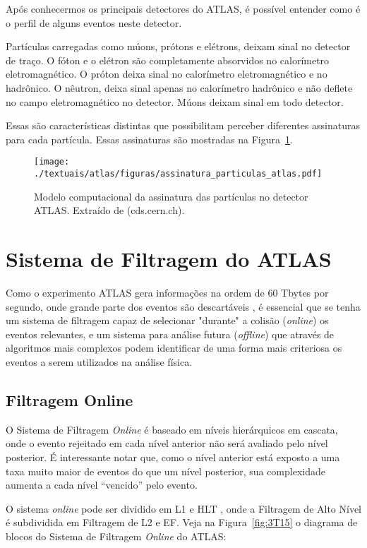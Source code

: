 Após conhecermos os principais detectores do ATLAS, é possível entender como  é o perfil de alguns eventos neste detector.
	
Partículas carregadas como múons, prótons e elétrons,  deixam sinal no detector de traço. O fóton e o elétron são completamente absorvidos no calorímetro eletromagnético. O próton deixa sinal no calorímetro eletromagnético e no hadrônico. O nêutron, deixa sinal apenas no calorímetro hadrônico e não deflete no campo eletromagnético no detector.  Múons deixam sinal em todo detector.
	
Essas são características distintas que possibilitam perceber diferentes assinaturas para cada partícula. Essas assinaturas são mostradas na Figura~\ref{fig:3T16}.

\begin{figure}[h!]
	\centering
	\texttt{[image: ./textuais/atlas/figuras/assinatura\_particulas\_atlas.pdf]}\\
	\caption{Modelo computacional da assinatura das partículas no detector ATLAS. Extraído de (cds.cern.ch).}
	\label{fig:3T16}
\end{figure}


\section{Sistema de Filtragem do ATLAS}

Como o experimento ATLAS gera informações na ordem de 60 Tbytes por segundo, onde grande parte dos eventos são descartáveis \cite{1352047}, é essencial que se tenha um sistema de filtragem capaz de selecionar "durante" a colisão (\emph{online}) os eventos relevantes, e um sistema para análise futura (\emph{offline}) que através de algoritmos mais complexos podem identificar de uma forma mais criteriosa os eventos a serem utilizados na análise física.

\subsection{Filtragem Online}

O Sistema de Filtragem \emph{Online} é baseado em níveis hierárquicos em cascata, onde o evento rejeitado em cada nível anterior não será avaliado pelo nível posterior. É interessante notar que, como o nível anterior está exposto a uma taxa muito maior de eventos do que um nível posterior, sua complexidade aumenta a cada nível “vencido” pelo evento.

O sistema \emph{online} pode ser dividido em \ac{L1} \cite{achenbach3atlas} e \ac{HLT} \cite{torres2010sistema}, onde a Filtragem de Alto Nível é subdividida em Filtragem de \ac{L2} e \ac{EF}. Veja na Figura~\ref{fig:3T15} o diagrama de blocos do Sistema de Filtragem \emph{Online} do ATLAS:

